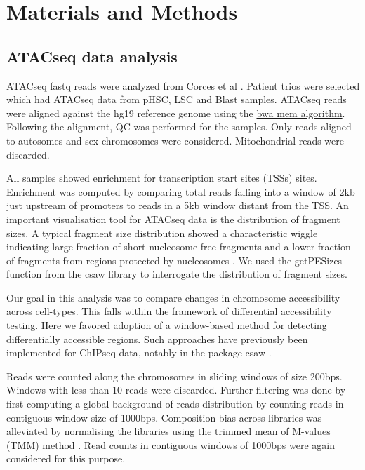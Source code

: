 \section{Materials and Methods}

\subsection{ATACseq data analysis}
ATACseq fastq reads were analyzed from Corces et al \cite{Corces2016}. Patient trios were selected which had ATACseq data from pHSC, LSC and Blast samples. ATACseq reads were aligned against the hg19 reference genome using the \href{https://arxiv.org/abs/1303.3997}{bwa mem algorithm}. Following the alignment, QC was performed for the samples. Only reads aligned to autosomes and sex chromosomes were considered. Mitochondrial reads were discarded.

All samples showed enrichment for transcription start sites (TSSs) sites. Enrichment was computed by comparing total reads falling into a window of 2kb just upstream of promoters to reads in a 5kb window distant from the TSS. An important visualisation tool for ATACseq data is the distribution of fragment sizes. A typical fragment size distribution showed a characteristic wiggle indicating large fraction of short nucleosome-free fragments and a lower fraction of fragments from regions protected by nucleosomes \cite{Buenrostro2013, buenrostro2015}. We used the getPESizes function from the csaw \cite{Lun2016} library to interrogate the distribution of fragment sizes.

Our goal in this analysis was to compare changes in chromosome accessibility across cell-types. This falls within the framework of differential accessibility testing. Here we favored adoption of a window-based method \cite{Lun2014} for detecting differentially accessible regions. Such approaches have previously been implemented for ChIPseq data, notably in the package csaw \cite{Lun2016}.

Reads were counted along the chromosomes in sliding windows of size 200bps. Windows with less than 10 reads were discarded. Further filtering was done by first computing a global background of reads distribution by counting reads in contiguous window size of 1000bps. Composition bias across libraries was alleviated by normalising the libraries using the trimmed mean of M-values (TMM) method \cite{Robinson2010}. Read counts in contiguous windows of 1000bps were again considered for this purpose.

